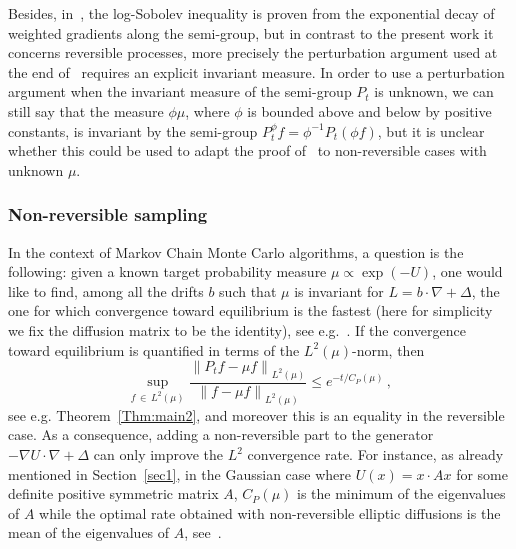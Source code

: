 \documentclass[10pt]{amsart}
\theoremstyle{definition}\newtheorem{defi}[theo]{Definition}\newtheorem{rema}[theo]{Remark}\newtheorem{exam}[theo]{Example}\newtheorem{exem}[theo]{Example}\newtheorem{nota}[theo]{Notation}
\newcommand{\na}{\nabla}
\newcommand{\1}{\mathbbm{1}}
\newcommand{\nv}[1]{#1}
\begin{document}
Besides, in~\cite[Corollary~1.3]{Wang3}, the log-Sobolev inequality is proven from the exponential decay of weighted gradients along the semi-group, but in contrast to the present work it concerns reversible processes, more precisely the perturbation argument used at the end of~\cite[Corollary~1.3]{Wang3} requires an explicit invariant measure. In order to use a perturbation argument when the invariant measure of the semi-group $P_t$ is unknown, we can still say that the measure $\phi\mu$, where $\phi$ is bounded above and below by positive constants, is invariant by the semi-group $P_t^\phi f= \phi^{-1} P_t(\phi f)$, but it is unclear whether this could be used to adapt the proof of~\cite{Wang3} to non-reversible cases with unknown $\mu$.

\subsubsection*{Non-reversible sampling}

In the context of Markov Chain Monte Carlo algorithms, a question is the following: given a known target probability measure $\mu\propto \exp(-U)$, one would like to find, among all the drifts $b$ such that $\mu$ is invariant for $L= b\cdot \na + \Delta$, the one for which convergence toward equilibrium is the fastest (here for simplicity we fix the diffusion matrix to be the identity), see e.g.~\cite{HHS1,HHS2,Lelievre2012,MonmarcheGuillinOU}. If the convergence toward equilibrium is quantified in term\nv{s} of the $L^2(\mu)$-norm, then
\[
\sup_{f\,\in\,L^2(\mu)} \frac{\left\|P_t f - \mu f\right\|_{L^2(\mu)}}{\left\|\nv{ f} - \mu f\right\|_{L^2(\mu)}} \leqslant e^{-t/C_P(\mu)}\,,
\]
see e.g. Theorem~\ref{Thm:main2}, and moreover this is an equality in the reversible case. As a consequence, adding a non-reversible part to the generator $-\na U \cdot\na + \Delta$ can only improve the $L^2$ convergence rate. For instance, \nv{as already mentioned in Section~\ref{sec1},} in the Gaussian case where $U(x) = x\cdot A x$ for some definite positive symmetric matrix $A$, $C_P(\mu)$ is the minimum of the eigenvalues of $A$ while the optimal rate obtained with non-reversible elliptic diffusions is the mean of the eigenvalues of $A$, see~\cite{Lelievre2012}.
\end{document}
